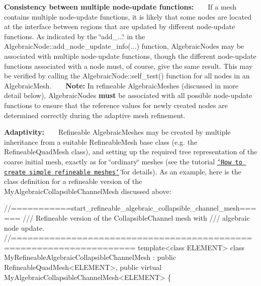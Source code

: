\begin{DoxyItemize}
\item {\bfseries Consistency between multiple node-\/update functions\+:} ~\newline
 ~\newline
 If a mesh contains multiple node-\/update functions, it is likely that some nodes are located at the interface between regions that are updated by different node-\/update functions. As indicated by the {\ttfamily \char`\"{}add\+\_\+...\char`\"{}} in the {\ttfamily Algebraic\+Node\+::add\+\_\+node\+\_\+update\+\_\+info}(...) function, {\ttfamily Algebraic\+Nodes} may be associated with multiple node-\/update functions, though the different node-\/update functions associated with a node must, of course, give the same result. This may be verified by calling the {\ttfamily Algebraic\+Node\+::self\+\_\+test()} function for all nodes in an {\ttfamily Algebraic\+Mesh}. ~\newline
 ~\newline
 {\bfseries Note\+:} In refineable {\ttfamily Algebraic\+Meshes} (discussed in more detail below), {\ttfamily Algebraic\+Nodes} {\bfseries must} be associated with all possible node-\/update functions to ensure that the reference values for newly created nodes are determined correctly during the adaptive mesh refinement. ~\newline
~\newline

\item {\bfseries Adaptivity\+:} ~\newline
 ~\newline
 Refineable {\ttfamily Algebraic\+Meshes} may be created by multiple inheritance from a suitable {\ttfamily Refineable\+Mesh} base class (e.\+g. the {\ttfamily Refineable\+Quad\+Mesh} class), and setting up the required tree representation of the coarse initial mesh, exactly as for \char`\"{}ordinary\char`\"{} meshes (see the tutorial \href{../../../poisson/two_d_poisson_adapt/html/index.html}{\tt \char`\"{}\+How to create simple refineable meshes\char`\"{}} for details). As an example, here is the class definition for a refineable version of the {\ttfamily My\+Algebraic\+Collapsible\+Channel\+Mesh} discussed above\+: ~\newline
 ~\newline
  
\begin{DoxyCodeInclude}
\textcolor{comment}{//===========start\_refineable\_algebraic\_collapsible\_channel\_mesh======}
\textcolor{comment}{/// Refineable version of the CollapsibleChannel mesh with}
\textcolor{comment}{}\textcolor{comment}{/// algebraic node update.}
\textcolor{comment}{}\textcolor{comment}{//====================================================================}
\textcolor{keyword}{template}<\textcolor{keyword}{class} ELEMENT>
\textcolor{keyword}{class }MyRefineableAlgebraicCollapsibleChannelMesh : 
  \textcolor{keyword}{public} RefineableQuadMesh<ELEMENT>,
  \textcolor{keyword}{public} \textcolor{keyword}{virtual} MyAlgebraicCollapsibleChannelMesh<ELEMENT>
\{ 


\end{DoxyCodeInclude}
\end{DoxyItemize}
